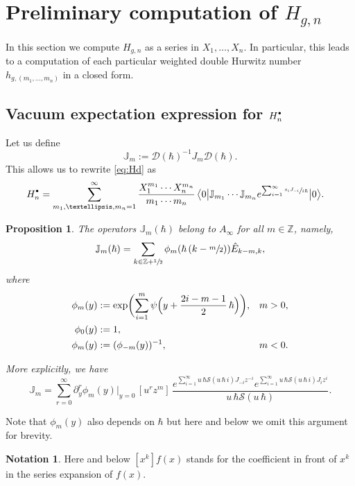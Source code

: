 \documentclass[11pt]{article}
\let\mathcal\mathscr
\newcommand{\sbullet}{{\scriptscriptstyle\bullet}}
\newcommand{\csbullet}{{\raisebox{1pt}{$\sbullet$}}}
\theoremstyle{plain}
\newtheorem{proposition}[theorem]{Proposition}
\theoremstyle{definition}
\newtheorem{notation}[theorem]{Notation}
\theoremstyle{remark}
\newcommand{\Z}{\mathbb{Z}}
\newcommand{\cD}{\mathcal{D}}
\newcommand{\cS}{\mathcal{S}}
\newcommand{\VEV}[1]{{\bigl\langle 0 \big| {#1} \big| 0 \bigr\rangle}}
\newcommand{\Hd}{H^\csbullet}
\newcommand{\euro}{\mathbb{J}}
\begin{document}
\section{Preliminary computation of \texorpdfstring{$H_{g,n}$}{Hgn}} \label{sec:preliminary}

In this section we compute $H_{g,n}$ as a series in $X_1,\dots,X_n$. In particular, this leads to a computation of each particular weighted double Hurwitz number $h_{g,(m_1,\dots,m_n)}$ in a closed form.

\subsection{Vacuum expectation expression for \texorpdfstring{$\Hd_n$}{Hn disconnected}}
Let us define
\begin{equation*}
\euro_m:=\cD(\hbar)^{-1}J_{m}\cD(\hbar).
\end{equation*}
This allows us to rewrite \eqref{eq:Hd} as
\begin{align}\label{eq:Hdisc1}
\Hd_n
&=\sum_{m_1,\dots,m_n=1}^\infty
\frac{X_1^{m_1}\cdots X_n^{m_n}}{m_1\cdots m_n}\,
\VEV{\euro_{m_1}\cdots \euro_{m_n}e^{\sum_{i=1}^\infty \sfrac{s_i J_{-i}}{i\hbar} }}.
\end{align}

\begin{proposition}\label{prop:OperJJ}
The operators $\euro_m(\hbar)$ belong to $A_\infty$ for all $m\in\Z$, namely,
\begin{equation}\label{eq:DJD}
\euro_m(\hbar) =\sum_{k\in\Z+\sfrac{1}{2}}\phi_m(\hbar\,(k-\sfrac m2))\hat E_{k-m,k},
\end{equation}
where
\begin{align}\label{eq:phimdef}
\phi_m(y)
&:=\exp\biggl(\sum_{i=1}^{m}\psi\Bigl(y+\dfrac{2i-m-1}{2}\, \hbar\Bigr)\biggr),&m>0,\\ \label{eq:phi0def}
\phi_0(y)&:=1,&\\
\notag\phi_m(y)&:=(\phi_{-m}(y))^{-1},&m<0.
\end{align}

More explicitly, we have
\begin{equation}\label{eq:euroJ}
\euro_m = \sum_{r=0}^\infty\partial_y^r\phi_m(y)\big|_{y=0}\,[u^rz^m]\,
\frac{
e^{\sum_{i=1}^\infty u\,\hbar\cS(u\,\hbar\,i) J_{-i}z^{-i}}
e^{\sum_{i=1}^\infty u\,\hbar \cS(u\,\hbar\,i) J_{i}z^{i}}}
{u\,\hbar\cS(u\,\hbar)}.
\end{equation}
\end{proposition}
\noindent Note that $\phi_m(y)$ also depends on $\hbar$ but here and below we omit this argument for brevity.
\begin{notation}
Here and below $[x^k]f(x)$ stands for the coefficient in front of $x^k$ in the series expansion of $f(x)$.
\end{notation}
\end{document}
